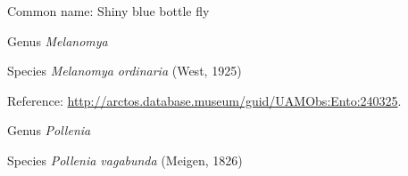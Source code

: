 \documentclass[9pt, article]{memoir}
\begin{document}
\begin{multicols}{2}
Common name: Shiny blue bottle fly

\vspace{6pt}\noindent\hspace{30pt}Genus \textit{Melanomya}


\vspace{6pt}\noindent\hspace{36pt}Species \textit{Melanomya ordinaria} (West, 1925)


Reference: 
\url{http://arctos.database.museum/guid/UAMObs:Ento:240325}.

\vspace{6pt}\noindent\hspace{30pt}Genus \textit{Pollenia}


\vspace{6pt}\noindent\hspace{36pt}Species \textit{Pollenia vagabunda} (Meigen, 1826)



\end{multicols}
\end{document}
